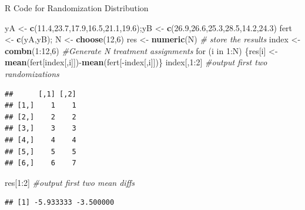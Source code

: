 \documentclass[9pt,ignorenonframetext,]{beamer}
\newenvironment{Shaded}{\begin{snugshade}}{\end{snugshade}}
\newcommand{\KeywordTok}[1]{\textcolor[rgb]{0.13,0.29,0.53}{\textbf{{#1}}}}
\newcommand{\DecValTok}[1]{\textcolor[rgb]{0.00,0.00,0.81}{{#1}}}
\newcommand{\FloatTok}[1]{\textcolor[rgb]{0.00,0.00,0.81}{{#1}}}
\newcommand{\StringTok}[1]{\textcolor[rgb]{0.31,0.60,0.02}{{#1}}}
\newcommand{\CommentTok}[1]{\textcolor[rgb]{0.56,0.35,0.01}{\textit{{#1}}}}
\newcommand{\NormalTok}[1]{{#1}}
\begin{document}
\begin{frame}[fragile]{R Code for Randomization Distribution}

\begin{Shaded}
\begin{Highlighting}[]
\NormalTok{yA <-}\StringTok{ }\KeywordTok{c}\NormalTok{(}\FloatTok{11.4}\NormalTok{,}\FloatTok{23.7}\NormalTok{,}\FloatTok{17.9}\NormalTok{,}\FloatTok{16.5}\NormalTok{,}\FloatTok{21.1}\NormalTok{,}\FloatTok{19.6}\NormalTok{);yB <-}\StringTok{ }\KeywordTok{c}\NormalTok{(}\FloatTok{26.9}\NormalTok{,}\FloatTok{26.6}\NormalTok{,}\FloatTok{25.3}\NormalTok{,}\FloatTok{28.5}\NormalTok{,}\FloatTok{14.2}\NormalTok{,}\FloatTok{24.3}\NormalTok{)}
\NormalTok{fert <-}\StringTok{ }\KeywordTok{c}\NormalTok{(yA,yB); N <-}\StringTok{ }\KeywordTok{choose}\NormalTok{(}\DecValTok{12}\NormalTok{,}\DecValTok{6}\NormalTok{)}
\NormalTok{res <-}\StringTok{ }\KeywordTok{numeric}\NormalTok{(N) }\CommentTok{# store the results}
\NormalTok{index <-}\KeywordTok{combn}\NormalTok{(}\DecValTok{1}\NormalTok{:}\DecValTok{12}\NormalTok{,}\DecValTok{6}\NormalTok{) }\CommentTok{#Generate N treatment assignments}
\NormalTok{for (i in }\DecValTok{1}\NormalTok{:N)}
\NormalTok{\{res[i] <-}\StringTok{ }\KeywordTok{mean}\NormalTok{(fert[index[,i]])-}\KeywordTok{mean}\NormalTok{(fert[-index[,i]])\}}
\NormalTok{index[,}\DecValTok{1}\NormalTok{:}\DecValTok{2}\NormalTok{] }\CommentTok{#output first two randomizations}
\end{Highlighting}
\end{Shaded}

\begin{verbatim}
##      [,1] [,2]
## [1,]    1    1
## [2,]    2    2
## [3,]    3    3
## [4,]    4    4
## [5,]    5    5
## [6,]    6    7
\end{verbatim}

\begin{Shaded}
\begin{Highlighting}[]
\NormalTok{res[}\DecValTok{1}\NormalTok{:}\DecValTok{2}\NormalTok{] }\CommentTok{#output first two mean diffs}
\end{Highlighting}
\end{Shaded}

\begin{verbatim}
## [1] -5.933333 -3.500000
\end{verbatim}

\end{frame}
\end{document}
